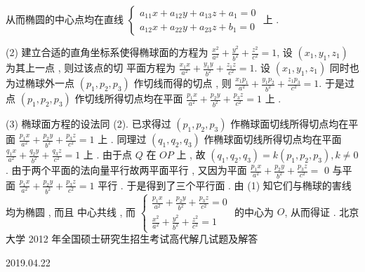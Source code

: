\documentclass[10pt]{article}
\begin{document}
 从而椭圆的中心点均在直线  $\left\{\begin{array}{l}a_{11} x+a_{12} y+a_{13} z+a_{1}=0 \\ a_{12} x+a_{22} y+a_{23} z+b_{1}=0\end{array}\right.$  上 .

(2)  建立合适的直角坐标系使得椭球面的方程为  $\frac{x^{2}}{a^{2}}+\frac{y^{2}}{b^{2}}+\frac{z^{2}}{c^{2}}=1$,  设  $\left(x_{1}, y_{1}, z_{1}\right)$  为其上一点 ,  则过该点的切   平面方程为  $\frac{x_{1} x}{a^{2}}+\frac{y_{1} y}{b^{2}}+\frac{z_{1} z}{c^{2}}=1$.  设  $\left(x_{1}, y_{1}, z_{1}\right)$  同时也为过椭球外一点  $\left(p_{1}, p_{2}, p_{3}\right)$  作切线而得的切点 ,  则  $\frac{x_{1} p_{1}}{a^{2}}+\frac{y_{1} p_{2}}{b^{2}}+\frac{z_{1} p_{3}}{c^{2}}=1$.  于是过点  $\left(p_{1}, p_{2}, p_{3}\right)$  作切线所得切点均在平面  $\frac{p_{1} x}{a^{2}}+\frac{p_{2} y}{b^{2}}+\frac{p_{3} z}{c^{2}}=1$  上 .

(3)  椭球面方程的设法同  (2).  已求得过  $\left(p_{1}, p_{2}, p_{3}\right)$  作椭球面切线所得切点均在平面  $\frac{p_{1} x}{a^{2}}+\frac{p_{2} y}{b^{2}}+\frac{p_{3} z}{c^{2}}=1$  上 .  同理过  $\left(q_{1}, q_{2}, q_{3}\right)$  作椭球面切线所得切点均在平面  $\frac{q_{1} x}{a^{2}}+\frac{q_{2} y}{b^{2}}+\frac{q_{3} z}{c^{2}}=1$  上 .  由于点  $Q$  在  $O P$  上 ,  故  $\left(q_{1}, q_{2}, q_{3}\right)=k\left(p_{1}, p_{2}, p_{3}\right), k \neq 0$.  由于两个平面的法向量平行故两平面平行 ,  又因为平面  $\frac{p_{1} x}{a^{2}}+\frac{p_{2} y}{b^{2}}+\frac{p_{3} z}{c^{2}}=$ 0  与平面  $\frac{p_{1} x}{a^{2}}+\frac{p_{2} y}{b^{2}}+\frac{p_{3} z}{c^{2}}=1$  平行 .  于是得到了三个平行面 .  由  (1)  知它们与椭球的害线均为椭圆 ,  而且   中心共线 ,  而  $\left\{\begin{array}{c}\frac{p_{1} x}{a^{2}}+\frac{p_{2} y}{b^{2}}+\frac{p_{3} z}{c^{2}}=0 \\ \frac{x^{2}}{a^{2}}+\frac{y^{2}}{b^{2}}+\frac{z^{2}}{c^{2}}=1\end{array}\right.$  的中心为  $O$,  从而得证 .  北京大学  2012  年全国硕士研究生招生考试高代解几试题及解答     

2019.04.22
\end{document}

